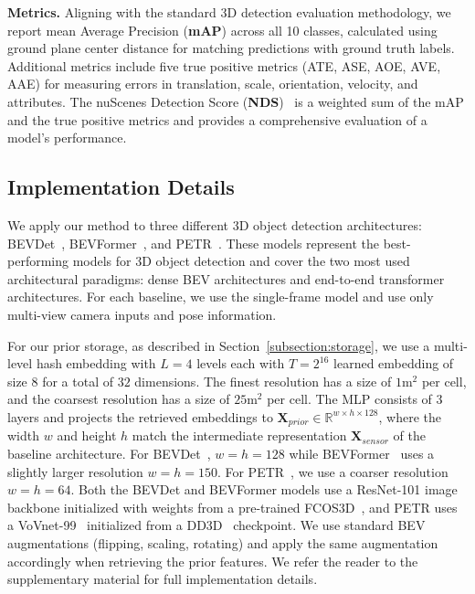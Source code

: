 \documentclass{article} %
\newcommand{\myparagraph}[1]{\vspace{0.2em}\noindent\textbf{#1}}
\newcommand{\xfeat}{\ensuremath{\mathbf{X}_{sensor}}}
\newcommand{\xprior}{\ensuremath{\mathbf{X}_{prior}}}
\begin{document}
\myparagraph{{Metrics.}}
Aligning with the standard 3D detection evaluation methodology, we report mean Average Precision (\textbf{mAP}) across all 10 classes, calculated using ground plane center distance for matching predictions with ground truth labels.
Additional metrics include five true positive metrics (ATE, ASE, AOE, AVE, AAE) for measuring errors in translation, scale, orientation, velocity, and attributes.
The nuScenes Detection Score (\textbf{NDS})~\cite{caesar2020nuscenes} is a weighted sum of the mAP and the true positive metrics and provides a comprehensive evaluation of a model's performance.

\subsection{Implementation Details}
\label{subsection:impl}

We apply our method to three different 3D object detection architectures: BEVDet~\cite{huang2021bevdet}, BEVFormer~\cite{li2022bevformer}, and PETR~\cite{liu2022petr}.
These models represent the best-performing models for 3D object detection and cover the two most used architectural paradigms: dense BEV architectures and end-to-end transformer architectures.
For each baseline, we use the single-frame model and use only multi-view camera inputs and pose information.

For our prior storage, as described in Section~\ref{subsection:storage}, we use a multi-level hash embedding with $L=4$ levels each with $T=2^{16}$ learned embedding of size $8$ for a total of $32$ dimensions.
The finest resolution has a size of $1\text{m}^2$ per cell, and the coarsest resolution has a size of $25 \text{m}^2$ per cell.
The MLP consists of 3 layers and projects the retrieved embeddings to $\xprior \in \mathbb{R}^{w\times h\times 128}$, where the width $w$ and height $h$ match the intermediate representation $\xfeat$ of the baseline architecture.
For BEVDet~\cite{huang2021bevdet}, $w=h=128$ while BEVFormer~\cite{li2022bevformer} uses a slightly larger resolution $w=h=150$.
For PETR~\cite{liu2022petr}, we use a coarser resolution $w=h=64$.
Both the BEVDet and BEVFormer models use a ResNet-101 image backbone initialized with weights from a pre-trained FCOS3D~\cite{wang2021fcos3d}, and PETR uses a VoVnet-99~\cite{lee2019energy} initialized from a DD3D~\cite{park2021pseudo} checkpoint.
We use standard BEV augmentations (flipping, scaling, rotating) and apply the same augmentation accordingly when retrieving the prior features.
We refer the reader to the supplementary material for full implementation details.
\end{document}
